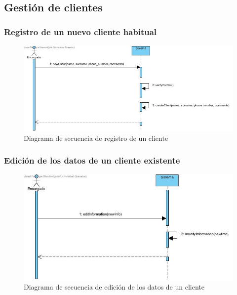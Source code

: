 \subsection{Gestión de clientes}

\subsubsection{Registro de un nuevo cliente habitual}

\begin{figure}[H]
	\centering
	\includegraphics[width=1\textwidth]{imagenes/imagenesDiagramas/Cliente/nuevoCliente.jpg}
	\caption{Diagrama de secuencia de registro de un cliente}
	\label{fig:seqdiag12}
\end{figure}

\subsubsection{Edición de los datos de un cliente existente}

\begin{figure}[H]
	\centering
	\includegraphics[width=1\textwidth]{imagenes/imagenesDiagramas/Cliente/editarCliente.jpg}
	\caption{Diagrama de secuencia de edición de los datos de un cliente}
	\label{fig:seqdiag13}
\end{figure}

